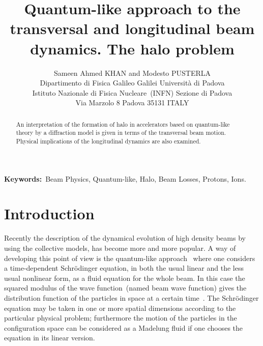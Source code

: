 \documentclass[]{article}
\title{\LARGE\bf Quantum-like approach to the transversal and
longitudinal beam dynamics. The halo problem}
\author{Sameen Ahmed KHAN and Modesto PUSTERLA\\
Dipartimento di Fisica Galileo Galilei  
Universit\`{a} di Padova \\
Istituto Nazionale di Fisica Nucleare~(INFN) Sezione di Padova \\
Via Marzolo 8 Padova 35131 ITALY}
\begin{document}
\maketitle

\begin{abstract}
An interpretation of the formation of halo in accelerators based on
quantum-like theory by a diffraction model is given in terms of the
transversal beam motion. Physical implications of the longitudinal dynamics 
are also examined.
\end{abstract}

\noindent
{\bf Keywords:}~Beam Physics, Quantum-like, Halo, Beam Losses, 
Protons, Ions.


\section{Introduction}
Recently the description of the dynamical evolution of high density 
beams by using the collective models, has become more and more popular.
A way of developing this point of view is the quantum-like 
approach~\cite{Fedele} where one considers a time-dependent 
Schr\"{o}dinger equation, in both the usual linear and the less usual 
nonlinear form, as a fluid equation for the whole beam. In this case 
the squared modulus of the wave function~(named beam wave function) gives
the distribution function of the particles in space at a certain 
time~\cite{PAC}. The Schr\"{o}dinger equation may be taken in one or more
spatial dimensions according to the particular physical problem; 
furthermore the  motion of the particles in the configuration space can 
be considered as a Madelung fluid if one chooses the equation in its
linear version.
\end{document}
